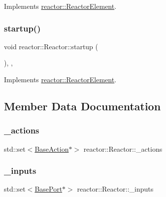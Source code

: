 Implements \hyperlink{classreactor_1_1ReactorElement_a8fce084bef582156979ebba56737e907}{reactor\+::\+Reactor\+Element}.

\mbox{\label{classreactor_1_1Reactor_ad254458867114f09a72e1e285ffc03d2}} 
\subsubsection{\texorpdfstring{startup()}{startup()}}
{\footnotesize\ttfamily void reactor\+::\+Reactor\+::startup (\begin{DoxyParamCaption}{ }\end{DoxyParamCaption})\hspace{0.3cm}{\ttfamily [final]}, {\ttfamily [override]}, {\ttfamily [virtual]}}



Implements \hyperlink{classreactor_1_1ReactorElement_a8cb574cb20ff963903ad905fb0a157e3}{reactor\+::\+Reactor\+Element}.



\subsection{Member Data Documentation}
\mbox{\label{classreactor_1_1Reactor_a08956f27d0316095058663a1e234854c}} 
\subsubsection{\texorpdfstring{\+\_\+actions}{\_actions}}
{\footnotesize\ttfamily std\+::set$<$\hyperlink{classreactor_1_1BaseAction}{Base\+Action}$\ast$$>$ reactor\+::\+Reactor\+::\+\_\+actions\hspace{0.3cm}{\ttfamily [private]}}

\mbox{\label{classreactor_1_1Reactor_a58b3ea8a7be4ff65de173fc8df01c8b1}} 
\subsubsection{\texorpdfstring{\+\_\+inputs}{\_inputs}}
{\footnotesize\ttfamily std\+::set$<$\hyperlink{classreactor_1_1BasePort}{Base\+Port}$\ast$$>$ reactor\+::\+Reactor\+::\+\_\+inputs\hspace{0.3cm}{\ttfamily [private]}}

